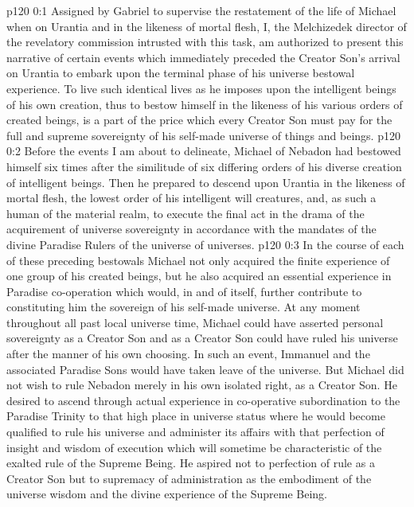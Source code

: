 \author{Mantutia Melchizedek}
\vs p120 0:1 Assigned by Gabriel to supervise the restatement of the life of Michael when on Urantia and in the likeness of mortal flesh, I, the Melchizedek director of the revelatory commission intrusted with this task, am authorized to present this narrative of certain events which immediately preceded the Creator Son’s arrival on Urantia to embark upon the terminal phase of his universe bestowal experience. To live such identical lives as he imposes upon the intelligent beings of his own creation, thus to bestow himself in the likeness of his various orders of created beings, is a part of the price which every Creator Son must pay for the full and supreme sovereignty of his self\hyp{}made universe of things and beings.
\vs p120 0:2 Before the events I am about to delineate, Michael of Nebadon had bestowed himself six times after the similitude of six differing orders of his diverse creation of intelligent beings. Then he prepared to descend upon Urantia in the likeness of mortal flesh, the lowest order of his intelligent will creatures, and, as such a human of the material realm, to execute the final act in the drama of the acquirement of universe sovereignty in accordance with the mandates of the divine Paradise Rulers of the universe of universes.
\vs p120 0:3 In the course of each of these preceding bestowals Michael not only acquired the finite experience of one group of his created beings, but he also acquired an essential experience in Paradise co\hyp{}operation which would, in and of itself, further contribute to constituting him the sovereign of his self\hyp{}made universe. At any moment throughout all past local universe time, Michael could have asserted personal sovereignty as a Creator Son and as a Creator Son could have ruled his universe after the manner of his own choosing. In such an event, Immanuel and the associated Paradise Sons would have taken leave of the universe. But Michael did not wish to rule Nebadon merely in his own isolated right, as a Creator Son. He desired to ascend through actual experience in co\hyp{}operative subordination to the Paradise Trinity to that high place in universe status where he would become qualified to rule his universe and administer its affairs with that perfection of insight and wisdom of execution which will sometime be characteristic of the exalted rule of the Supreme Being. He aspired not to perfection of rule as a Creator Son but to supremacy of administration as the embodiment of the universe wisdom and the divine experience of the Supreme Being.
